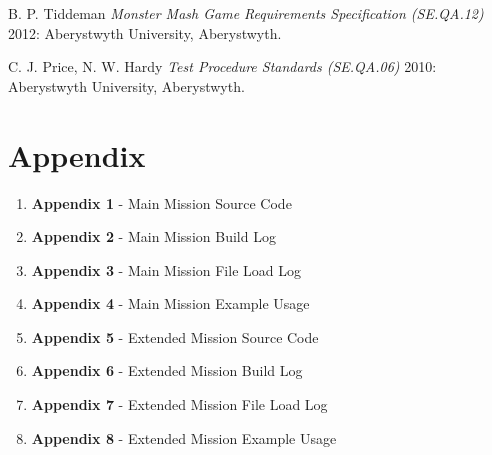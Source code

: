 \documentclass[12pt]{article}
\begin{document}
  \begin{thebibliography}{1}

   B. P. Tiddeman {\em Monster Mash Game Requirements Specification (SE.QA.12)}  2012: Aberystwyth University, Aberystwyth.

    C. J. Price, N. W. Hardy {\em Test Procedure Standards (SE.QA.06)}  2010: Aberystwyth University, Aberystwyth.

  \end{thebibliography}
  
\section*{Appendix}

\begin{enumerate}
  \item \textbf{Appendix 1} - Main Mission Source Code
  \item \textbf{Appendix 2} - Main Mission Build Log
  \item \textbf{Appendix 3} - Main Mission File Load Log
  \item \textbf{Appendix 4} - Main Mission Example Usage
  \item \textbf{Appendix 5} - Extended Mission Source Code
  \item \textbf{Appendix 6} - Extended Mission Build Log
  \item \textbf{Appendix 7} - Extended Mission File Load Log
  \item \textbf{Appendix 8} - Extended Mission Example Usage
\end{enumerate}
\end{document}
